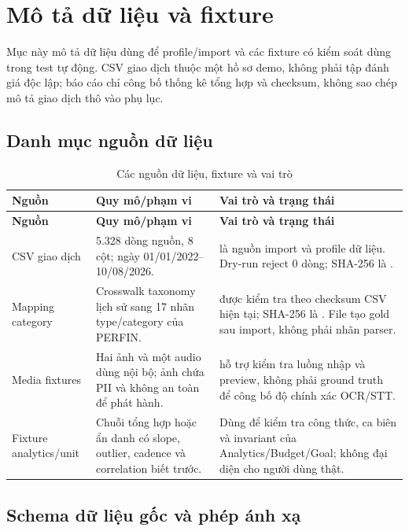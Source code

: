 \section{Mô tả dữ liệu và fixture}
\label{app:dataset-description}

Mục này mô tả dữ liệu dùng để profile/import và các fixture có kiểm soát dùng trong test tự động. CSV giao dịch thuộc một hồ sơ demo, không phải tập đánh giá độc lập; báo cáo chỉ công bố thống kê tổng hợp và checksum, không sao chép mô tả giao dịch thô vào phụ lục.

\subsection{Danh mục nguồn dữ liệu}

\begin{longtable}{@{}L{3.3cm}L{4.2cm}L{7.0cm}@{}}
  \caption{Các nguồn dữ liệu, fixture và vai trò}
  \label{tab:app-dataset-sources}\\
  \toprule
  \textbf{Nguồn} & \textbf{Quy mô/phạm vi} & \textbf{Vai trò và trạng thái} \\
  \midrule
  \endfirsthead
  \toprule
  \textbf{Nguồn} & \textbf{Quy mô/phạm vi} & \textbf{Vai trò và trạng thái} \\
  \midrule
  \endhead
  CSV giao dịch & 5.328 dòng nguồn, 8 cột; ngày 01/01/2022--10/08/2026. &  là nguồn import và profile dữ liệu. Dry-run reject 0 dòng; SHA-256 là . \\
  Mapping category & Crosswalk taxonomy lịch sử sang 17 nhãn type/category của PERFIN. &  được kiểm tra theo checksum CSV hiện tại; SHA-256 là . File tạo gold sau import, không phải nhãn parser. \\
  Media fixtures & Hai ảnh và một audio dùng nội bộ; ảnh chứa PII và không an toàn để phát hành. &  hỗ trợ kiểm tra luồng nhập và preview, không phải ground truth để công bố độ chính xác OCR/STT. \\
  Fixture analytics/unit & Chuỗi tổng hợp hoặc ẩn danh có slope, outlier, cadence và correlation biết trước. & Dùng để kiểm tra công thức, ca biên và invariant của Analytics/Budget/Goal; không đại diện cho người dùng thật. \\
  \bottomrule
\end{longtable}

\subsection{Schema dữ liệu gốc và phép ánh xạ}

